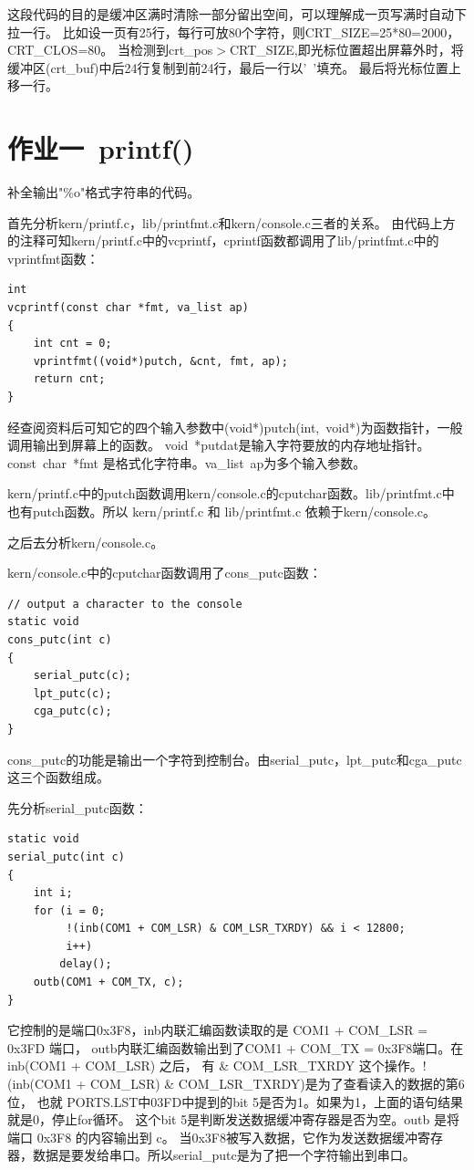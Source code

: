 \documentclass[12pt,a4paper,UTF8]{article}
\begin{document}
	这段代码的目的是缓冲区满时清除一部分留出空间，可以理解成一页写满时自动下拉一行。
	比如设一页有25行，每行可放80个字符，则CRT\_SIZE=25*80=2000，CRT\_CLOS=80。
	当检测到crt\_pos$>$CRT\_SIZE,即光标位置超出屏幕外时，将缓冲区(crt\_buf)中后24行复制到前24行，最后一行以'\ '填充。
	最后将光标位置上移一行。

\section{作业一\ printf()}

补全输出"\%o"格式字符串的代码。

首先分析kern/printf.c，lib/printfmt.c和kern/console.c三者的关系。
由代码上方的注释可知kern/printf.c中的vcprintf，cprintf函数都调用了lib/printfmt.c中的vprintfmt函数：

\begin{lstlisting}[style=CPP]
int
vcprintf(const char *fmt, va_list ap)
{
	int cnt = 0;
	vprintfmt((void*)putch, &cnt, fmt, ap);
	return cnt;
}    
\end{lstlisting}

经查阅资料后可知它的四个输入参数中(void*)putch(int,\ void*)为函数指针，一般调用输出到屏幕上的函数。
void\ *putdat是输入字符要放的内存地址指针。const\ char\ *fmt 是格式化字符串。va\_list\ ap为多个输入参数。

kern/printf.c中的putch函数调用kern/console.c的cputchar函数。lib/printfmt.c中也有putch函数。所以 kern/printf.c 和 lib/printfmt.c 依赖于kern/console.c。

之后去分析kern/console.c。

kern/console.c中的cputchar函数调用了cons\_putc函数：

\begin{lstlisting}[style=CPP]
// output a character to the console
static void
cons_putc(int c)
{
	serial_putc(c);
	lpt_putc(c);
	cga_putc(c);
}
\end{lstlisting}

cons\_putc的功能是输出一个字符到控制台。由serial\_putc，lpt\_putc和cga\_putc这三个函数组成。

先分析serial\_putc函数：

\begin{lstlisting}[style=CPP]
static void
serial_putc(int c)
{
	int i;
	for (i = 0;
	     !(inb(COM1 + COM_LSR) & COM_LSR_TXRDY) && i < 12800;
	     i++)
		delay();
	outb(COM1 + COM_TX, c);
}
\end{lstlisting}

它控制的是端口0x3F8，inb内联汇编函数读取的是 COM1 + COM\_LSR = 0x3FD 端口，
outb内联汇编函数输出到了COM1 + COM\_TX = 0x3F8端口。在 inb(COM1 + COM\_LSR) 之后，
有 \& COM\_LSR\_TXRDY 这个操作。!(inb(COM1 + COM\_LSR) \& COM\_LSR\_TXRDY)是为了查看读入的数据的第6位，
也就 PORTS.LST中03FD中提到的bit 5是否为1。如果为1，上面的语句结果就是0，停止for循环。
这个bit 5是判断发送数据缓冲寄存器是否为空。outb 是将端口 0x3F8 的内容输出到 c。
当0x3F8被写入数据，它作为发送数据缓冲寄存器，数据是要发给串口。所以serial\_putc是为了把一个字符输出到串口。
\end{document}
